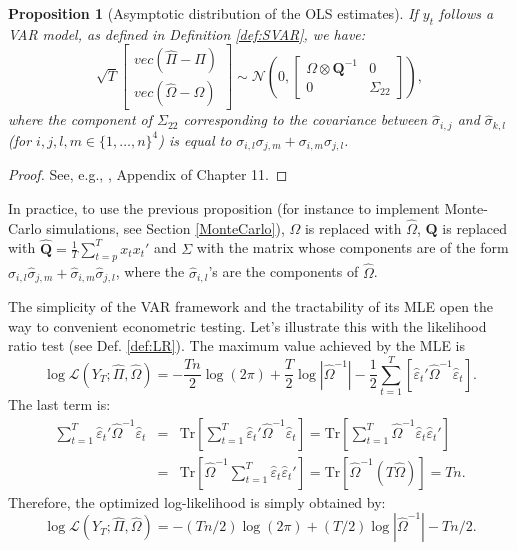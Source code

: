 \documentclass[
  12pt,
]{book}
\newtheorem{proposition}{Proposition}[chapter]
\theoremstyle{definition}
\theoremstyle{definition}
\theoremstyle{definition}
\theoremstyle{definition}
\theoremstyle{remark}
\begin{document}
\begin{proposition}[Asymptotic distribution of the OLS estimates]
\protect\hypertarget{prp:OLSVAR2}{}\label{prp:OLSVAR2}If \(y_t\) follows a VAR model, as defined in Definition \ref{def:SVAR}, we have:
\begin{equation}
\sqrt{T}\left[
\begin{array}{c}
vec(\hat\Pi - \Pi)\\
vec(\hat\Omega - \Omega)
\end{array}
\right]
\sim \mathcal{N}\left(0,
\left[
\begin{array}{cc}
\Omega \otimes \mathbf{Q}^{-1} & 0\\
0 & \Sigma_{22}
\end{array}
\right]\right),
\label{eq:asymptPi}
\end{equation}
where the component of \(\Sigma_{22}\) corresponding to the covariance between \(\hat\sigma_{i,j}\) and \(\hat\sigma_{k,l}\) (for \(i,j,l,m \in \{1,\dots,n\}^4\)) is equal to \(\sigma_{i,l}\sigma_{j,m}+\sigma_{i,m}\sigma_{j,l}\).
\end{proposition}

\begin{proof}
See, e.g., \citet{Hamilton_1994}, Appendix of Chapter 11.
\end{proof}

In practice, to use the previous proposition (for instance to implement Monte-Carlo simulations, see Section \ref{MonteCarlo}), \(\Omega\) is replaced with \(\hat{\Omega}\), \(\mathbf{Q}\) is replaced with \(\hat{\mathbf{Q}} = \frac{1}{T}\sum_{t=p}^T x_t x_t'\) and \(\Sigma\) with the matrix whose components are of the form \(\hat\sigma_{i,l}\hat\sigma_{j,m}+\hat\sigma_{i,m}\hat\sigma_{j,l}\), where the \(\hat\sigma_{i,l}\)'s are the components of \(\hat\Omega\).

The simplicity of the VAR framework and the tractability of its MLE open the way to convenient econometric testing. Let's illustrate this with the likelihood ratio test (see Def. \ref{def:LR}). The maximum value achieved by the MLE is
\[
\log\mathcal{L}(Y_{T};\hat{\Pi},\hat{\Omega}) = -\frac{Tn}{2}\log(2\pi)+\frac{T}{2}\log\left|\hat{\Omega}^{-1}\right| -\frac{1}{2}\sum_{t=1}^{T}\left[\hat{\varepsilon}_{t}'\hat{\Omega}^{-1}\hat{\varepsilon}_{t}\right].
\]
The last term is:
\begin{eqnarray*}
\sum_{t=1}^{T}\hat{\varepsilon}_{t}'\hat{\Omega}^{-1}\hat{\varepsilon}_{t} &=& \mbox{Tr}\left[\sum_{t=1}^{T}\hat{\varepsilon}_{t}'\hat{\Omega}^{-1}\hat{\varepsilon}_{t}\right] = \mbox{Tr}\left[\sum_{t=1}^{T}\hat{\Omega}^{-1}\hat{\varepsilon}_{t}\hat{\varepsilon}_{t}'\right]\\
&=&\mbox{Tr}\left[\hat{\Omega}^{-1}\sum_{t=1}^{T}\hat{\varepsilon}_{t}\hat{\varepsilon}_{t}'\right] = \mbox{Tr}\left[\hat{\Omega}^{-1}\left(T\hat{\Omega}\right)\right]=Tn.
\end{eqnarray*}
Therefore, the optimized log-likelihood is simply obtained by:
\begin{equation}
\log\mathcal{L}(Y_{T};\hat{\Pi},\hat{\Omega})=-(Tn/2)\log(2\pi)+(T/2)\log\left|\hat{\Omega}^{-1}\right|-Tn/2.
\label{eq:optimzedLogL}
\end{equation}
\end{document}
